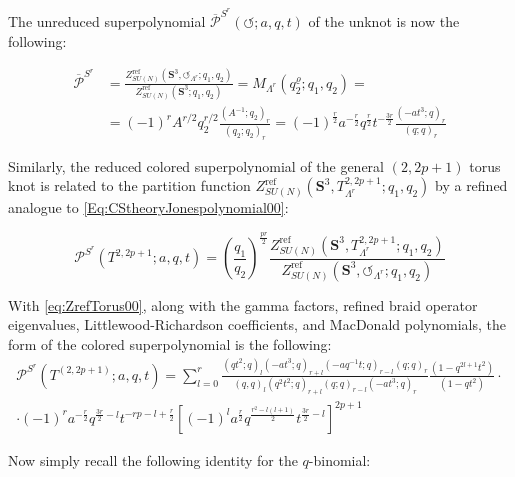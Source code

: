 \documentclass[a4paper,titlepage,twoside]{book}
\begin{document}
The unreduced superpolynomial $\overline{\mathcal{P}}^{ S^r}( \circlearrowleft; a,q,t)$ of the unknot is now the following:

\begin{equation}
\begin{aligned}
  \overline{ \mathcal{P}}^{S^r} & = \frac{ Z^{\text{ref}}_{SU(N)}{ (\mathbf{S}^3, \circlearrowleft_{\Lambda^r}; q_1,q_2) } }{  Z^{\text{ref}}_{SU(N)}{ (\mathbf{S}^3;q_1,q_2) } } = M_{\Lambda^r}{ (q_2^{\varrho}; q_1, q_2 ) } = \\
  & = (-1)^r A^{r/2} q_2^{r/2}  \frac{ (A^{-1}; q_2 )_r }{ (q_2;q_2)_r } = (-1)^{ \frac{r}{2} } a^{ -\frac{r}{2} } q^{ \frac{r}{2} } t^{ - \frac{3r}{2} } \frac{ (-at^3;q)_r }{ (q;q)_r } 
\end{aligned} \label{Eq:unreducedPaqtUnknotrefinedCS}
\end{equation}

Similarly, the reduced colored superpolynomial of the general $(2,2p+1)$ torus knot is related to the partition function $Z^{\text{ref}}_{SU(N)}{ (\mathbf{S}^3, T^{2, 2p+1 }_{\Lambda^r};q_1,q_2) }$ by a refined analogue to \eqref{Eq:CStheoryJonespolynomial00}:

\begin{equation}
  \mathcal{P}^{S^r}(T^{ 2, 2p+1}; a,q,t) = \left( \frac{q_1}{q_2} \right)^{  \frac{pr}{2} } \frac{ Z^{\text{ref}}_{SU(N)}{ (\mathbf{S}^3, T^{2, 2p+1}_{\Lambda^r}; q_1,q_2 ) } }{ Z^{\text{ref}}_{SU(N)}(\mathbf{S}^3, \circlearrowleft_{\Lambda^r};q_1,q_2) }
\end{equation}

With \eqref{eq:ZrefTorus00}, along with the gamma factors, refined braid operator eigenvalues, Littlewood-Richardson coefficients, and MacDonald polynomials, the form of the colored superpolynomial is the following:
\begin{equation}
\begin{gathered}
  \mathcal{P}^{S^r}( T^{(2,2p+1)}; a,q,t ) = \sum_{ l=0}^r \frac{ (qt^2; q)_l (-at^3; q)_{r+l} (-aq^{-1} t; q)_{r-l} (q;q)_r }{ (q,q)_l (q^2 t^2; q)_{r+l} (q;q)_{r-l} (-at^3; q)_r } \frac{ ( 1 - q^{2l + 1} t^2 ) }{ (1-qt^2 ) } \cdot \\
  \cdot (-1)^r a^{ - \frac{r}{2} } q^{ \frac{3r}{2} - l } t^{ -rp - l + \frac{r}{2} } \left[ (-1)^l a^{\frac{r}{2} } q^{  \frac{r^2 - l (l+1  ) }{ 2}  }t^{ \frac{3r}{2} - l } \right]^{2p+1}
\end{gathered}
\end{equation}

Now simply recall the following identity for the $q$-binomial:
\end{document}
